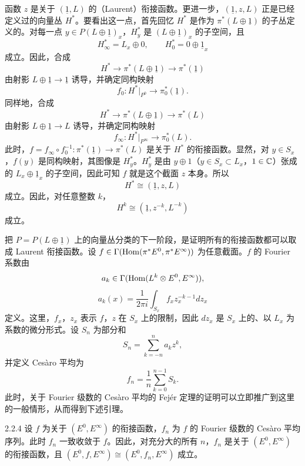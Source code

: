 函数 $z$ 是关于 $(\underline{1},L)$ 的（Laurent）衔接函数。更进一步，$(\underline{1},z,L)$ 正是已经定义过的向量丛 $H^*$。要看出这一点，首先回忆 $H^*$ 是作为 $\pi^*(L\oplus\underline{1})$ 的子丛定义的。对每一点 $y\in P(L\oplus\underline{1})_x$，$H^*_y$ 是 $(L\oplus\underline{1})_x$ 的子空间，且
\[
H^*_\infty=L_x\oplus0,\qquad H^*_0=0\oplus\underline{1}_x
\]
成立。因此，合成
\[
H^*\longrightarrow\pi^*(L\oplus\underline{1})\longrightarrow\pi^*(\underline{1})
\]
由射影 $L\oplus\underline{1}\to\underline{1}$ 诱导，并确定同构映射
\[
f_0\colon H^*|_{P^0}\longrightarrow\pi_0^*(\underline{1}).
\]
同样地，合成
\[
H^*\longrightarrow\pi^*(L\oplus\underline{1})\longrightarrow\pi^*(L)
\]
由射影 $L\oplus\underline{1}\to L$ 诱导，并确定同构映射
\[
f_\infty\colon H^*|_{P^\infty}\longrightarrow\pi_0^*(L).
\]
此时，$f=f_\infty\circ f_0^{-1}\colon\pi^*(\underline{1})\to\pi^*(L)$ 是关于 $H^*$ 的衔接函数。显然，对 $y\in S_x$，$f(y)$ 是同构映射，其图像是 $H^*_y$。$H^*_y$ 是由 $y\oplus1$（$y\in S_x\subset L_x$，$1\in\mathbb{C}$）张成的 $L_x\oplus\underline{1}_x$ 的子空间，因此可知 $f$ 就是这个截面 $z$ 本身。所以
\[
H^*\cong(\underline{1},z,L)
\]
成立。因此，对任意整数 $k$，
\[
H^k\cong(\underline{1},z^{-k},L^{-k})
\]
成立。

把 $P=P(L\oplus\underline{1})$ 上的向量丛分类的下一阶段，是证明所有的衔接函数都可以取成 Laurent 衔接函数。设 $f\in\Gamma(\operatorname{Hom}(\pi^{*}E^0,\pi^{*}E^\infty))$ 为任意截面。$f$ 的 Fourier 系数由
\[
a_k\in\Gamma(\operatorname{Hom}(L^k\otimes E^0,E^\infty)),
\]
\[
a_k(x)=\frac{1}{2\pi i}\int_{S_x}f_xz_x^{-k-1}dz_x
\]
定义。这里，$f_x$，$z_x$ 表示 $f$，$z$ 在 $S_x$ 上的限制，因此 $dz_x$ 是 $S_x$ 上的、以 $L_x$ 为系数的微分形式。设 $S_n$ 为部分和
\[
S_n=\sum_{k=-n}^{n}a_kz^k,
\]
并定义 Cesàro 平均为
\[
f_n=\frac{1}{n}\sum_{k=0}^{n-1}S_k.
\]
此时，关于 Fourier 级数的 Cesàro 平均的 Fejér 定理的证明可以立即推广到这里的一般情形，从而得到下述引理。

\begin{lemma*}{2.2.4}
  设 $f$ 为关于 $(E^0,E^\infty)$ 的衔接函数，$f_n$ 为 $f$ 的 Fourier 级数的 Cesàro 平均序列。此时 $f_n$ 一致收敛于 $f$。因此，对充分大的所有 $n$，$f_n$ 是关于 $(E^0,E^\infty)$ 的衔接函数，且 $(E^0,f,E^\infty)\cong(E^0,f_n,E^\infty)$ 成立。
\end{lemma*}

